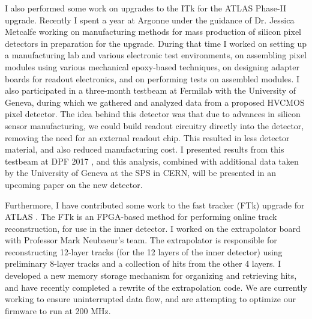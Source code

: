 I also performed some work on upgrades to the ITk for the ATLAS Phase-II upgrade. Recently I spent a year at Argonne under the guidance of Dr. Jessica Metcalfe working on manufacturing methods for mass production of silicon pixel detectors in preparation for the upgrade. During that time I worked on setting up a manufacturing lab and various electronic test environments, on assembling pixel modules using various mechanical epoxy-based techniques, on designing adapter boards for readout electronics, and on performing tests on assembled modules. I also participated in a three-month testbeam at Fermilab with the University of Geneva, during which we gathered and analyzed data from a proposed HVCMOS pixel detector. The idea behind this detector was that due to advances in silicon sensor manufacturing, we could build readout circuitry directly into the detector, removing the need for an external readout chip. This resulted in less detector material, and also reduced manufacturing cost. I presented results from this testbeam at DPF 2017 \cite{DPF}, and this analysis, combined with additional data taken by the University of Geneva at the SPS in CERN, will be presented in an upcoming paper on the new detector.

Furthermore, I have contributed some work to the fast tracker (FTk) upgrade for ATLAS \cite{FTk}. The FTk is an FPGA-based method for performing online track reconstruction, for use in the inner detector. I worked on the extrapolator board with Professor Mark Neubaeur's team. The extrapolator is responsible for reconstructing 12-layer tracks (for the 12 layers of the inner detector) using preliminary 8-layer tracks and a collection of hits from the other 4 layers. I developed a new memory storage mechanism for organizing and retrieving hits, and have recently completed a rewrite of the extrapolation code. We are currently working to ensure uninterrupted data flow, and are attempting to optimize our firmware to run at 200 MHz.